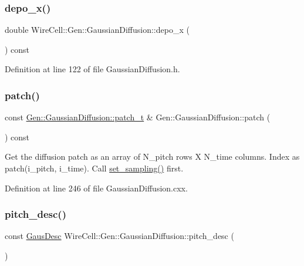 \subsubsection{\texorpdfstring{depo\+\_\+x()}{depo\_x()}}
{\footnotesize\ttfamily double Wire\+Cell\+::\+Gen\+::\+Gaussian\+Diffusion\+::depo\+\_\+x (\begin{DoxyParamCaption}{ }\end{DoxyParamCaption}) const\hspace{0.3cm}{\ttfamily [inline]}}



Definition at line 122 of file Gaussian\+Diffusion.\+h.

\mbox{\label{class_wire_cell_1_1_gen_1_1_gaussian_diffusion_a0917ea09022f97d0274ee90b6aeb97b8}} 
\subsubsection{\texorpdfstring{patch()}{patch()}}
{\footnotesize\ttfamily const \hyperlink{class_wire_cell_1_1_gen_1_1_gaussian_diffusion_a33cd8c39349ac40f3757405be6d8f7b0}{Gen\+::\+Gaussian\+Diffusion\+::patch\+\_\+t} \& Gen\+::\+Gaussian\+Diffusion\+::patch (\begin{DoxyParamCaption}{ }\end{DoxyParamCaption}) const}

Get the diffusion patch as an array of N\+\_\+pitch rows X N\+\_\+time columns. Index as patch(i\+\_\+pitch, i\+\_\+time). Call \hyperlink{class_wire_cell_1_1_gen_1_1_gaussian_diffusion_aee13d3eff7f4d5b15d2bffd7b982fae4}{set\+\_\+sampling()} first. 

Definition at line 246 of file Gaussian\+Diffusion.\+cxx.

\mbox{\label{class_wire_cell_1_1_gen_1_1_gaussian_diffusion_a356c64883ec23fcf9c5b2ef056cf4888}} 
\subsubsection{\texorpdfstring{pitch\+\_\+desc()}{pitch\_desc()}}
{\footnotesize\ttfamily const \hyperlink{struct_wire_cell_1_1_gen_1_1_gaus_desc}{Gaus\+Desc} Wire\+Cell\+::\+Gen\+::\+Gaussian\+Diffusion\+::pitch\+\_\+desc (\begin{DoxyParamCaption}{ }\end{DoxyParamCaption})\hspace{0.3cm}{\ttfamily [inline]}}




